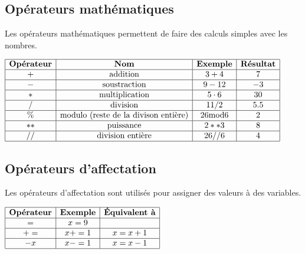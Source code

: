 \documentclass[a4paper,11pt]{article}
\begin{document}
\subsection{Opérateurs mathématiques}
Les opérateurs mathématiques permettent de faire des calculs simples avec les nombres.\par
\begin{center}
$\begin{array}{|c|c|c|c|}
\hline
\textbf{Opérateur} & \textbf{Nom} & \textbf{Exemple} & \textbf{Résultat} \\
\hline
+ & \text{addition} & 3 + 4 & 7\\
\hline
- & \text{soustraction} & 9 - 12 & -3\\
\hline
* & \text{multiplication} & 5 \cdot 6 & 30\\
\hline
/ & \text{division} & 11 / 2 & 5.5\\
\hline
\% & \text{modulo (reste de la divison entière)} & 26 \text{mod} 6 & 2\\
\hline
** & \text{puissance} & 2**3 & 8\\
\hline
// & \text{division entière} & 26 // 6 & 4\\
\hline
\end{array}$
\end{center}

\subsection{Opérateurs d'affectation}
Les opérateurs d'affectation sont utilisés pour assigner des valeurs à des variables.\par
\begin{center}
$\begin{array}{|c|c|c|}
\hline
\textbf{Opérateur} & \textbf{Exemple} & \textbf{Équivalent à} \\
\hline
= & x = 9 & \\
\hline
+= & x += 1 & x = x + 1\\
\hline
-x & x -= 1 & x = x -1\\
\hline
\end{array}$
\end{center}
\end{document}
